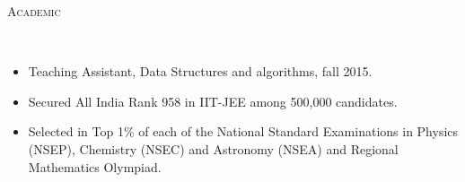 \documentclass[9pt]{article}
\newenvironment{changemargin}[2]{%
  \begin{list}{}{%
      \setlength{\topsep}{0pt}%
    \setlength{\leftmargin}{#1}%
    \setlength{\rightmargin}{#2}%
    \setlength{\listparindent}{\parindent}%
  \setlength{\itemindent}{\parindent}%
    \setlength{\parsep}{\parskip}%
    }%
  \item[]}{\end{list}
    }
\newcommand{\lineover}{
  \begin{changemargin}{-0.05in}{-0.10in}
    \vspace*{-9pt}
    \hrulefill \\
    \vspace*{-2pt}
  \end{changemargin}
}
\newcommand{\header}[1]{
  \begin{changemargin}{-0.5in}{-0.5in}
    \scshape{#1}\\
        \lineover
  \end{changemargin}
}
\newenvironment{body} {
  \vspace*{-16pt}
        \begin{changemargin}{-0.6in}{-0.65in}
        }	
        {\end{changemargin}
}
\begin{document}



\header{Academic}
\begin{body}
  \vspace{14pt}
        \begin{changemargin}{0.15in}{0.15in}
          \begin{itemize}
            \item Teaching Assistant, Data Structures and algorithms, fall 2015.
            \item Secured All India Rank 958 in IIT-JEE among 500,000 candidates.
            \item Selected in Top 1\% of each of the National Standard Examinations 
              in Physics (NSEP), Chemistry (NSEC) and Astronomy (NSEA) and Regional
              Mathematics Olympiad.
          \end{itemize}
        \end{changemargin}
\end{body}
\end{document}
